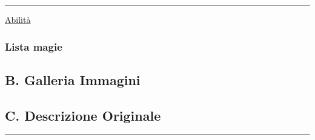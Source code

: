 \begin{center}\rule{0.5\linewidth}{0.5pt}\end{center}

\href{Abilita\%CC\%80\%2053ae6f3de7934c788bbc4fc8c0b18d5e.csv}{Abilità}

\subsubsection{Lista magie}\label{lista-magie}

\subsection{B. Galleria Immagini}\label{b.-galleria-immagini}

\subsection{C. Descrizione Originale}\label{c.-descrizione-originale}

\begin{center}\rule{0.5\linewidth}{0.5pt}\end{center}
